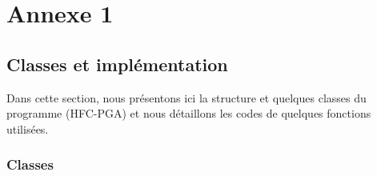 \chapter{Annexe 1}

\section{Classes et implémentation}
	
	Dans cette section, nous présentons ici la structure et quelques classes du programme (HFC-PGA) et nous détaillons les codes de quelques fonctions utilisées.
	
	\subsection{Classes}
	

